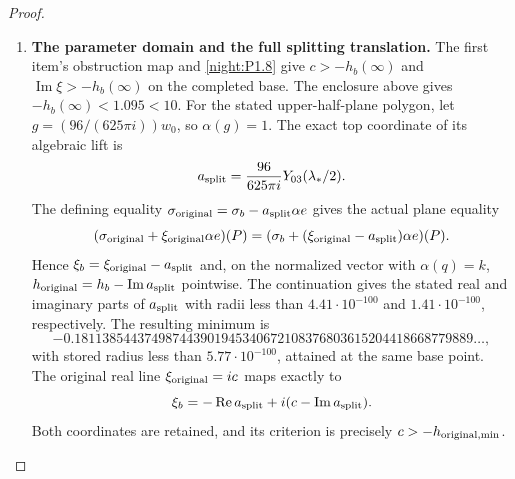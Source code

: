 \documentclass[11pt,a4paper]{article}
\theoremstyle{definition}
\begin{document}
\begin{proof}
\begin{enumerate}[label=\arabic*.]
\[ \tag{1.18.6}
\]
Put $y_0=\log100/(2\pi)$ and $t=y-y_0\ge0$.
The four coefficients of
$\det(tI_3+y_0I_3+B(q))$, in increasing degree, have the
uniform lower bounds
\[
 1.9918,\qquad4.9602,\qquad3.9580,\qquad1,
\]
with the last coefficient exactly one. Thus the determinant is
positive on the punctured inner disc.
In the actual real $J$ coordinates, a graph vector $(Zv,v)$
is real precisely when $v$ is real and $(\operatorname{Im}Z)v=0$.
The determinant therefore proves transversality of the
$c_*$ plane there. By the first item's exact obstruction map,
$h_b-h_b(\infty)$ never vanishes. The punctured disc is connected,
and at $q=1/100$ the certified value
$h_b=-0.4504422009074\ldots$ is greater than $h_b(\infty)$.
Consequently $h_b>h_b(\infty)$ throughout this disc.

For completeness these same graph maps prove the cusp limit.
The lower block of $e_J$ vanishes, so $L$ is independent of a
real parameter $c$, and $C_c$ is holomorphic at zero and affine
in $c$. For any fixed real bound $M$, it is uniformly bounded
on a smaller closed disc and the compact interval between
$c_*$ and $-M$. As $y\to\infty$, the Neumann inverse makes
$yI+\operatorname{Im}C_c$ invertible uniformly on that interval.
The real quantity $h_b+c$ cannot cross zero along it. Its sign
at $c_*$ is positive, so $h_b-M>0$ at the other endpoint.
This proves $h_b\to+\infty$ at the cusp. The covers and the
strict local estimate now prove the global minimum and its
uniqueness.

\item \textbf{The parameter domain and the full splitting translation.}
The first item's obstruction map and \cref{night:P1.8} give
$c>-h_b(\infty)$ and $\operatorname{Im}\xi>-h_b(\infty)$
on the completed base. The enclosure above gives
$-h_b(\infty)<1.095<10$.
For the stated upper-half-plane polygon, let
$g=(96/(625\pi i))w_0$, so $\alpha(g)=1$.
The exact top coordinate of its algebraic lift is
\[
 a_{\rm split}=\frac{96}{625\pi i}Y_{03}(\lambda_*/2).
\]
The defining equality
$\sigma_{\rm original}=\sigma_b-a_{\rm split}\alpha e$
gives the actual plane equality
\[
 (\sigma_{\rm original}+\xi_{\rm original}\alpha e)(P)
  =(\sigma_b+(\xi_{\rm original}-a_{\rm split})\alpha e)(P).
\]
Hence $\xi_b=\xi_{\rm original}-a_{\rm split}$ and, on the
normalized vector with $\alpha(q)=k$,
$h_{\rm original}=h_b-\operatorname{Im}a_{\rm split}$ pointwise.
The continuation gives the stated real and imaginary parts of
$a_{\rm split}$ with radii less than $4.41\cdot10^{-100}$ and
$1.41\cdot10^{-100}$, respectively. The resulting minimum is
\[
 -0.181138544374987443901945340672108376803615204418668779889\ldots,
\]
with stored radius less than $5.77\cdot10^{-100}$, attained
at the same base point. The original real line
$\xi_{\rm original}=ic$ maps exactly to
\[
 \xi_b=-\operatorname{Re}a_{\rm split}
          +i(c-\operatorname{Im}a_{\rm split}).
\]
Both coordinates are retained, and its criterion is precisely
$c>-h_{{\rm original},\min}$.


\end{enumerate}
\end{proof}
\end{document}
